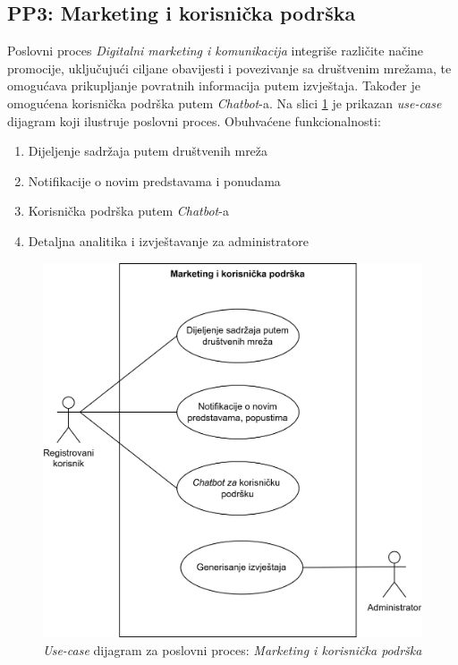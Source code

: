 \subsection{PP3: Marketing i korisnička podrška}

Poslovni proces \textit{Digitalni marketing i komunikacija} integriše različite načine promocije, uključujući ciljane obavijesti i povezivanje sa društvenim mrežama, te omogućava prikupljanje povratnih informacija putem izvještaja. Također je omogućena korisnička podrška putem \textit{Chatbot}-a. Na slici \ref{fig:pp3} je prikazan \textit{use-case} dijagram koji ilustruje poslovni proces. Obuhvaćene funkcionalnosti:

\begin{enumerate}
    \item Dijeljenje sadržaja putem društvenih mreža
    \item Notifikacije o novim predstavama i ponudama
    \item Korisnička podrška putem \textit{Chatbot}-a
    \item Detaljna analitika i izvještavanje za administratore
\end{enumerate}

\newpage
\vspace*{0pt}
\begin{figure}[t!]
    \centering
    \includegraphics[width=0.6\linewidth]{Slike/Poslovni procesi/PP3.drawio.png}
    \caption{\textit{Use-case} dijagram za poslovni proces: \textit{Marketing i korisnička podrška}}
    \label{fig:pp3}
\end{figure}
\newpage